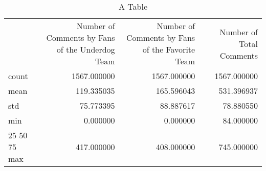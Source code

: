 \begin{table}
\caption{A Table}
\label{tab:descriptive}
\begin{tabular}{lrrr}
 & Number of Comments by Fans of the Underdog Team & Number of Comments by Fans of the Favorite Team & Number of Total Comments \\
count & 1567.000000 & 1567.000000 & 1567.000000 \\
mean & 119.335035 & 165.596043 & 531.396937 \\
std & 75.773395 & 88.887617 & 78.880550 \\
min & 0.000000 & 0.000000 & 84.000000 \\
25%
50%
75%
max & 417.000000 & 408.000000 & 745.000000 \\
\end{tabular}
\end{table}
